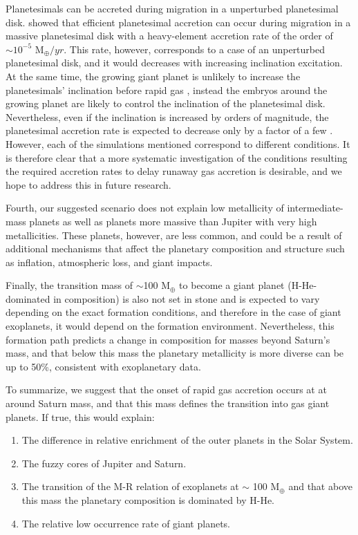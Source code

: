\documentclass{aa}
\begin{document}
{Planetesimals can be accreted during migration in a unperturbed planetesimal disk.  \citet{2022ApJ...926L..37S} showed that efficient planetesimal accretion can occur during migration in a massive planetesimal disk with a heavy-element accretion rate of the order of  $\sim10^{-5}$ M$_{\oplus}/yr$.  
This rate, however, corresponds to a case of an unperturbed planetesimal disk, and it would decreases with increasing inclination excitation. 
At the same time, the growing giant planet is unlikely to increase the planetesimals' inclination before rapid gas \citep[e.g.,][]{1999Icar..139..350T}, instead the embryos around the growing planet are likely to control the inclination of  the planetesimal disk. Nevertheless, even if the inclination is increased by orders of magnitude, the  planetesimal accretion rate is expected to decrease only by a factor of a few \citep{2023MNRAS.519.1713S}. 
However, each of the simulations mentioned correspond to different conditions.  It is therefore clear that a more systematic investigation of the conditions resulting the required  accretion rates to delay runaway gas accretion is desirable, and we hope to address this in future research.   
\par 

 

Fourth, our suggested scenario does not explain low metallicity of intermediate-mass planets as well as planets more massive than Jupiter with very high metallicities. These planets, however, are less common, and could be a result of additional mechanisms that affect the planetary composition and structure such as inflation, atmospheric loss, and giant impacts. 
\par

Finally, the transition mass of $\sim$100 M$_{\oplus}$ to become a giant planet (H-He-dominated in composition) is also not set in stone and is expected to vary depending on the exact formation conditions, and therefore in the case of giant exoplanets, it would depend on the formation environment. %
Nevertheless, this formation path predicts a change in composition for masses beyond Saturn's mass, and that below this mass the planetary metallicity is more diverse can be up to 50\%, consistent with exoplanetary data. %

To summarize, we suggest that the onset of rapid gas accretion occurs at at around Saturn mass, and that this mass defines the transition into gas giant planets. 
If true, this would explain:
\begin{enumerate} 
%
\item The difference in relative enrichment of the outer planets in the Solar System.
\item The fuzzy cores of Jupiter and Saturn. 
\item The transition of the M-R relation of exoplanets at $\sim$ 100 M$_{\oplus}$ and that above this mass the planetary composition is dominated by H-He.
\item The relative low occurrence rate of giant planets. 
\end{enumerate} 

}
\end{document}
